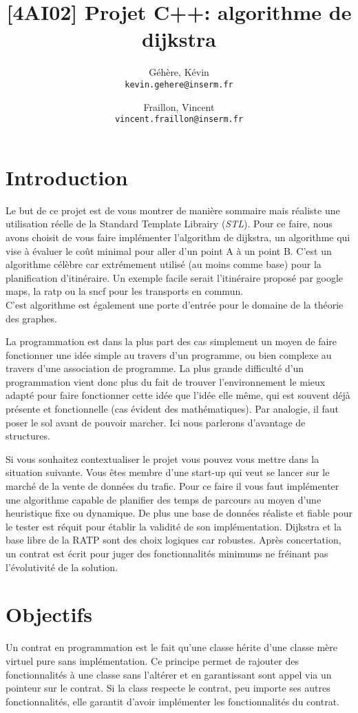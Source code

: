 \documentclass[9pts]{article}
\title{[4AI02] Projet C++: algorithme de dijkstra}
\author{
  Géhère, Kévin\\
  \texttt{kevin.gehere@inserm.fr}
  \and
  Fraillon, Vincent\\
  \texttt{vincent.fraillon@inserm.fr}
}
\begin{document}
\maketitle

\section{Introduction}
Le but de ce projet est de vous montrer de manière sommaire mais réaliste une utilisation réelle de la Standard Template Librairy (\emph{STL}).
Pour ce faire, nous avons choisit de vous faire implémenter l'algorithm de dijkstra,
un algorithme qui vise à évaluer le coût minimal pour aller d'un point A à un point B.
C'est un algorithme célèbre car extrémement utilisé (au moins comme base) pour la planification d'itinéraire.
Un exemple facile serait l'itinéraire proposé par google maps, la ratp ou la sncf pour les transports en commun.\\
C'est algorithme est également une porte d'entrée pour le domaine de la théorie des graphes.

La programmation est dans la plus part des cas simplement un moyen de faire fonctionner une idée simple au travers d'un programme,
ou bien complexe au travers d'une association de programme.
La plus grande difficulté d'un programmation vient donc plus du fait de trouver l'environnement le mieux adapté pour faire fonctionner cette idée que l'idée elle même,
qui est souvent déjà présente et fonctionnelle (cas évident des mathématiques).
Par analogie, il faut poser le sol avant de pouvoir marcher.
Ici nous parlerons d'avantage de structures.

Si vous souhaitez contextualiser le projet vous pouvez vous mettre dans la situation suivante.
Vous êtes membre d'une start-up qui veut se lancer sur le marché de la vente de données du trafic.
Pour ce faire il vous faut implémenter une algorithme capable de planifier des temps de parcours au moyen d'une heuristique fixe ou dynamique.
De plus une base de données réaliste et fiable pour le tester est réquit pour établir la validité de son implémentation.
Dijkstra et la base libre de la RATP sont des choix logiques car robustes.
Après concertation, un contrat est écrit pour juger des fonctionnalités minimums ne fréinant pas l'évolutivité de la solution.

\section{Objectifs}
Un contrat en programmation est le fait qu'une classe hérite d'une classe mère virtuel pure sans implémentation.
Ce principe permet de rajouter des fonctionnalités à une classe sans l'altérer et en garantissant sont appel via un pointeur sur le contrat.
Si la class respecte le contrat, peu importe ses autres fonctionnalités, elle garantit d'avoir implémenter les fonctionnalités du contrat. \\
\end{document}
